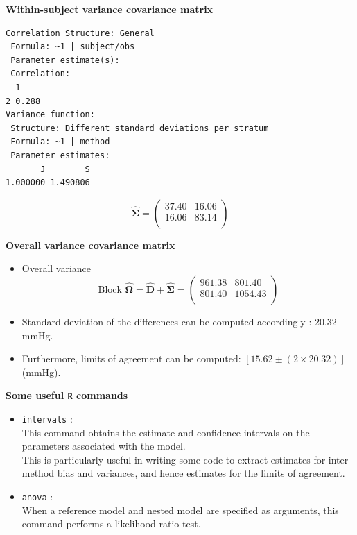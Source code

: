 \documentclass[compress]{beamer}        %
\makeatletter
\newcommand{\tcb}{\textcolor{beamer@blendedblue}}
\makeatother
\begin{document}
\begin{frame}[fragile]{\bf \tcb{Within-subject variance covariance matrix}}
\begin{verbatim}
Correlation Structure: General
 Formula: ~1 | subject/obs
 Parameter estimate(s):
 Correlation:
  1
2 0.288
Variance function:
 Structure: Different standard deviations per stratum
 Formula: ~1 | method
 Parameter estimates:
       J        S
1.000000 1.490806
\end{verbatim}
\[
 \hat{\boldsymbol{\Sigma}} = \left(
\begin{array}{cc}
37.40 & 16.06 \\
16.06 & 83.14 \\
\end{array}\right)
\]
\end{frame}
\begin{frame}[fragile]{\bf \tcb{Overall variance covariance matrix}}

\begin{itemize}\itemsep0.7cm
\item Overall variance \[
\mbox{Block }\hat{\boldsymbol{\Omega}} = \hat{\boldsymbol{D}} + \hat{\boldsymbol{\Sigma}} =
 \left(
\begin{array}{cc}
961.38 & 801.40 \\
801.40 & 1054.43 \\
\end{array}
\right)
\]

\item Standard deviation of the differences can be computed accordingly : 20.32 mmHg.

\item Furthermore, limits of agreement can be computed: $[15.62 \pm (2 \times 20.32) ]$ (mmHg).
\end{itemize}
\end{frame}


\begin{frame}{\bf \tcb{Some useful \texttt{R} commands}}
\begin{itemize}

\item \texttt{intervals} :\vspace{0.25cm} \\This command obtains the estimate and confidence intervals on the parameters associated with the model.\\
    This is particularly useful in writing some code to extract estimates for inter-method bias and variances, and hence estimates for the limits of agreement.

\item \texttt{anova} : \vspace{0.25cm} \\When a reference model and nested model are specified as arguments, this command performs a likelihood ratio test.
\end{itemize}
\end{frame}
\end{document}
